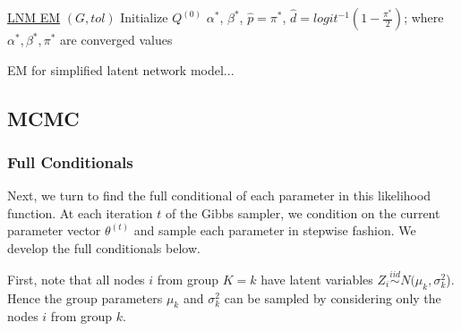 \documentclass{article}
\begin{document}


\begin{algorithm*}\label{EM_alg}
    \underline{LNM EM} $(G, tol)$\;
    Initialize $Q^{(0)}$
     \Return $\alpha^*$, $\beta^*$, $\hat{p} = \pi^*$, $\hat{d} = logit^{-1}(1 - \frac{\pi^*}{2})$; where $\alpha^*, \beta^*, \pi^*$ are converged values \
    \caption{EM for simplified latent network model...}
\end{algorithm*}

\subsection{MCMC}\label{MCMC}
\subsubsection{Full Conditionals}
Next, we turn to find the full conditional of each parameter in this likelihood function. At each iteration $t$ of the Gibbs sampler, we condition on the current parameter vector $\theta^{(t)}$ and sample each parameter in stepwise fashion. We develop the full conditionals below.

First, note that all nodes $i$ from group $K = k$ have latent variables $Z_i \overset{iid}\sim N(\mu_k, \sigma_k^2$). Hence the group parameters $\mu_k$ and $\sigma^2_k$ can be sampled by considering only the nodes $i$ from group $k$.
\end{document}
